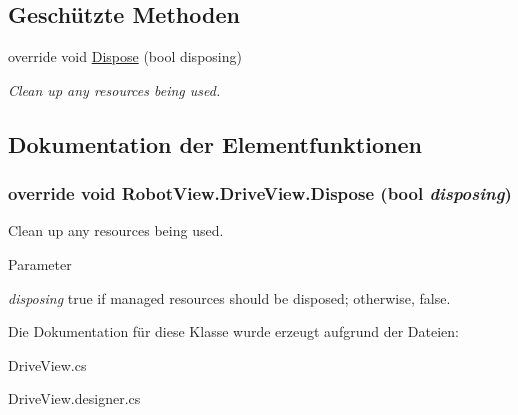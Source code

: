 \subsection*{Geschützte Methoden}
\begin{DoxyCompactItemize}
\item 
override void \hyperlink{class_robot_view_1_1_drive_view_a0e75395dfd60b445e558f8071eb08ea5}{Dispose} (bool disposing)
\begin{DoxyCompactList}\small\item\em Clean up any resources being used. \item\end{DoxyCompactList}\end{DoxyCompactItemize}


\subsection{Dokumentation der Elementfunktionen}
\hypertarget{class_robot_view_1_1_drive_view_a0e75395dfd60b445e558f8071eb08ea5}{
\subsubsection[{Dispose}]{\setlength{\rightskip}{0pt plus 5cm}override void RobotView.DriveView.Dispose (bool {\em disposing})}}
\label{class_robot_view_1_1_drive_view_a0e75395dfd60b445e558f8071eb08ea5}


Clean up any resources being used. 


\begin{DoxyParams}{Parameter}
\item[{\em disposing}]true if managed resources should be disposed; otherwise, false.\end{DoxyParams}


Die Dokumentation für diese Klasse wurde erzeugt aufgrund der Dateien:\begin{DoxyCompactItemize}
\item 
DriveView.cs\item 
DriveView.designer.cs\end{DoxyCompactItemize}
